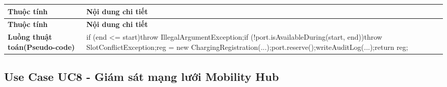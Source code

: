 \vspace{-0.5\baselineskip}
\begin{longtable}{|L{0.24\textwidth}|L{0.70\textwidth}|}
\hline
\textbf{Thuộc tính} & \textbf{Nội dung chi tiết} \\
\hline
\endfirsthead
\hline
\textbf{Thuộc tính} & \textbf{Nội dung chi tiết} \\
\hline
\endhead
\textbf{Luồng thuật toán}\newline \textbf{(Pseudo-code)} & if (end <= start)\newline throw IllegalArgumentException;\newline if (!port.isAvailableDuring(start, end))\newline throw SlotConflictException;\newline reg = new ChargingRegistration(...);\newline port.reserve();\newline writeAuditLog(...);\newline return reg; \\
\hline
\end{longtable}
\vspace{-0.5\baselineskip}
\subsection{Use Case UC8 - Giám sát mạng lưới Mobility Hub}

